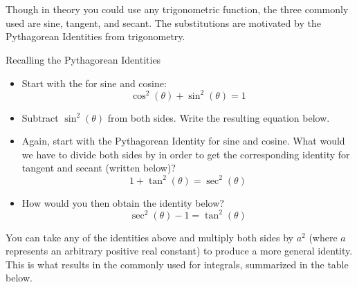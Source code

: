 
\section{}

Though in theory you could use any trigonometric function, the three commonly used  are sine, tangent, and secant.  The substitutions are motivated by the Pythagorean Identities from trigonometry.

\begin{exercise}{Recalling the Pythagorean Identities \Coffeecup} 
\begin{itemize}
\item Start with the  for sine and cosine: $$\cos^2\left(\theta\right)+\sin^2\left(\theta\right)=1 $$
\item Subtract $\sin^2\left(\theta\right) $ from both sides.  Write the resulting equation below.
\item Again, start with the Pythagorean Identity for sine and cosine.  What would we have to divide both sides by in order to get the corresponding identity for tangent and secant (written below)?
$$1+\tan^2\left(\theta\right)=\sec^2\left(\theta\right) $$
\item How would you then obtain the identity below?
$$\sec^2\left(\theta\right)-1=\tan^2\left(\theta\right) $$
\end{itemize}
\end{exercise}

You can take any of the identities above and multiply both sides by $a^2$ (where $a$ represents an arbitrary positive real constant) to produce a more general identity.  This is what results in the commonly used  for integrals, summarized in the table below.


